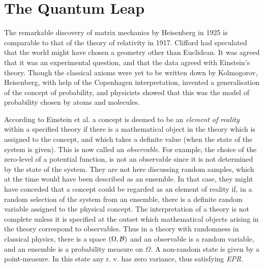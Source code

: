 \section{The Quantum Leap}
The remarkable discovery of matrix mechanics by Heisenberg in 1925
is comparable to that of the theory of relativity in 1917.
Clifford had
speculated that the world might have chosen a geometry other than Euclidean.
It was agreed that it was an experimental question, and that the data
agreed with Einstein's theory. Though the classical axioms were yet to
be written down by Kolmogorov, Heisenberg, with
help of the Copenhagen interpretation, invented a generalisation of the
concept of probability, and physicists showed that this was the model of
probability chosen by atoms and molecules.

According to Einstein et al. \cite{Einstein2} a concept
is deemed to be an {\em element of reality} within
a specified theory if there is a mathematical object in the theory which
is assigned to the concept, and which takes a definite value (when the
state of the system is given). This
is now called an {\em observable}.
For example, the choice of the zero-level of a potential function, is not
an observable since it is not determined by the state of the system.
They are not here discussing
random samples, which at the time would have been described as an ensemble.
In that case, they might have conceded that a concept could be regarded as
an element of reality if, in a random selection of the system from an
ensemble, there is a definite random variable assigned to the physical
concept.
The interpretation of a theory is not complete unless it is
specified at the outset which mathematical
objects arising in the theory correspond to observables. Thus in a theory
with randomness in classical physics, there is a space $(\Omega,{\cal B})$
and an observable is a random variable, and an ensemble is a probability
measure on $\Omega$. A non-random state is given by a point-measure. In
this state any r. v. has zero variance, thus satisfying {\em EPR}.

